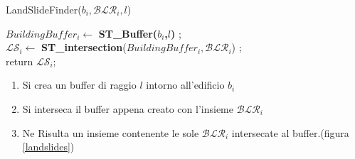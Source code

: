 \begin{algorithm}[H]
	
	\IncMargin{1em}
	\caption{LandSlideFinder($b_i , \mathcal{BLR}_i, l$) }
	\label{alg:four}
	\BlankLine
	\SetAlgoNoLine
	$ BuildingBuffer_i  \leftarrow $ \textbf{ST\_Buffer($b_i$,$l$)} ;\\
	$ \mathcal{LS}_i \leftarrow $ \textbf{ST\_intersection}($BuildingBuffer_i,\mathcal{BLR}_i $) ;\\
	return $\mathcal{LS}_i;$
\end{algorithm}

\begin{enumerate}
	\item Si crea un buffer di raggio $l$ intorno all'edificio $b_i$
	\item Si interseca il buffer appena creato con l'insieme  $\mathcal{BLR}_i$
	\item Ne Risulta un insieme contenente le sole $\mathcal{BLR}_i$ intersecate al buffer.(figura \ref{landslides}) 
\end{enumerate}

